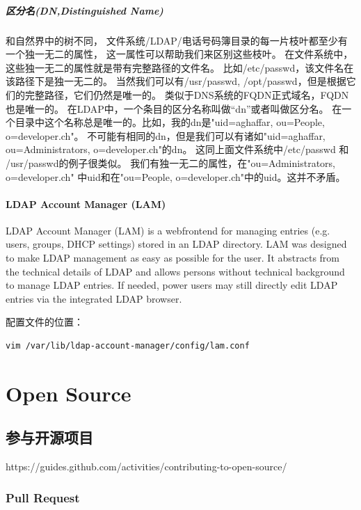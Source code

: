 \documentclass{book}
\begin{document}
\paragraph{区分名(DN,Distinguished Name)}和自然界中的树不同，
文件系统/LDAP/电话号码簿目录的每一片枝叶都至少有一个独一无二的属性，
这一属性可以帮助我们来区别这些枝叶。 
在文件系统中， 这些独一无二的属性就是带有完整路径的文件名。
比如/etc/passwd，该文件名在该路径下是独一无二的。
当然我们可以有/usr/passwd, /opt/passwd，但是根据它们的完整路径，它们仍然是唯一的。 
类似于DNS系统的FQDN正式域名，FQDN也是唯一的。 
在LDAP中，一个条目的区分名称叫做“dn”或者叫做区分名。
在一个目录中这个名称总是唯一的。比如，我的dn是"uid=aghaffar, ou=People, o=developer.ch"。
不可能有相同的dn，但是我们可以有诸如"uid=aghaffar, ou=Administrators, o=developer.ch"的dn。
这同上面文件系统中/etc/passwd 和 /usr/passwd的例子很类似。 
我们有独一无二的属性，在"ou=Administrators, o=developer.ch" 中uid和在"ou=People, o=developer.ch"中的uid。这并不矛盾。 

\subsubsection{LDAP Account Manager (LAM) }

LDAP Account Manager (LAM) is a webfrontend for managing entries (e.g. users, groups, DHCP settings) stored in an LDAP directory. LAM was designed to make LDAP management as easy as possible for the user. It abstracts from the technical details of LDAP and allows persons without technical background to manage LDAP entries. If needed, power users may still directly edit LDAP entries via the integrated LDAP browser.

配置文件的位置：

\begin{lstlisting}[language=Bash]
vim /var/lib/ldap-account-manager/config/lam.conf
\end{lstlisting}


\chapter{Open Source}

\section{参与开源项目}

https://guides.github.com/activities/contributing-to-open-source/

\subsection{Pull Request}
\end{document}
